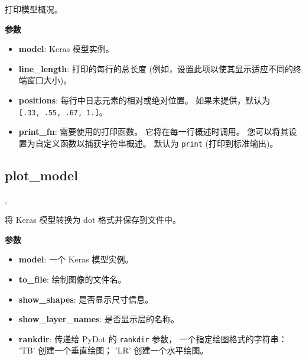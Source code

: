 打印模型概况。

\textbf{参数}

\begin{itemize}
\tightlist
\item
  \textbf{model}: Keras 模型实例。
\item
  \textbf{line\_length}: 打印的每行的总长度
  (例如，设置此项以使其显示适应不同的终端窗口大小)。
\item
  \textbf{positions}: 每行中日志元素的相对或绝对位置。
  如果未提供，默认为 \texttt{{[}.33,\ .55,\ .67,\ 1.{]}}。
\item
  \textbf{print\_fn}: 需要使用的打印函数。 它将在每一行概述时调用。
  您可以将其设置为自定义函数以捕获字符串概述。 默认为 \texttt{print}
  (打印到标准输出)。
\end{itemize}



\subsection{plot\_model}\label{plotux5fmodel}

\begin{Shaded}
\begin{Highlighting}[]
\OperatorTok{=}\OperatorTok{=}, \\
\hspace{3cm}\OperatorTok{=}\OperatorTok{=}\NormalTok{)}
\end{Highlighting}
\end{Shaded}

将 Keras 模型转换为 dot 格式并保存到文件中。

\textbf{参数}

\begin{itemize}
\tightlist
\item
  \textbf{model}: 一个 Keras 模型实例。
\item
  \textbf{to\_file}: 绘制图像的文件名。
\item
  \textbf{show\_shapes}: 是否显示尺寸信息。
\item
  \textbf{show\_layer\_names}: 是否显示层的名称。
\item
  \textbf{rankdir}: 传递给 PyDot 的 \texttt{rankdir} 参数，
  一个指定绘图格式的字符串： 'TB' 创建一个垂直绘图； 'LR'
  创建一个水平绘图。
\end{itemize}



